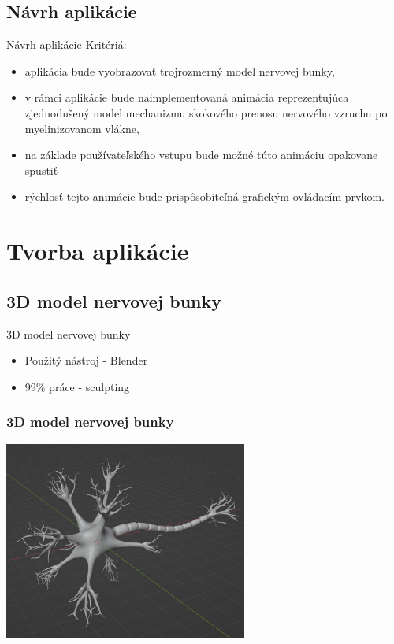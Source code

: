 \documentclass[pdf,aspectratio=169]{beamer}
\begin{document}
\subsection{Návrh aplikácie}
\begin{frame}{Návrh aplikácie}
    Kritériá:
        \begin{itemize}
        \item aplikácia bude vyobrazovať trojrozmerný model nervovej bunky,
        \item v rámci aplikácie bude naimplementovaná animácia reprezentujúca zjednodušený model mechanizmu skokového prenosu nervového vzruchu po myelinizovanom vlákne,
        \item na základe používateľského vstupu bude možné túto animáciu opakovane spustiť
        \item rýchlosť tejto animácie bude prispôsobiteľná grafickým ovládacím prvkom.
        \end{itemize}
\end{frame}

\section{Tvorba aplikácie}
\subsection{3D model nervovej bunky}
\begin{frame}{3D model nervovej bunky}
    \begin{itemize}
        \item Použitý nástroj - Blender
        \item 99\% práce - sculpting
    \end{itemize}
\end{frame}

\begin{frame}
    \frametitle{3D model nervovej bunky}    
    \begin{center}
        \includegraphics[width=8cm]{../img/finalModel-crop.png}
    \end{center}    
\end{frame}
\end{document}
